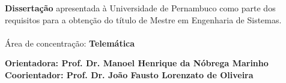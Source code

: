 \begin{flushright}
    \vspace{0.5in}
    \parbox{3.50in}
    {\textbf{Dissertação} apresentada à Universidade de Pernambuco como parte dos requisitos para a obtenção do título de Mestre em Engenharia de Sistemas.\\ 
    \\Área de concentração: \textbf{Telemática} }

\end{flushright}

\vspace{1.2ex}

\begin{center}



\vspace{1ex} {\textbf{Orientadora: Prof. Dr. Manoel Henrique da Nóbrega Marinho} }\\
\vspace{1ex} {\textbf{Coorientador: Prof. Dr. João Fausto Lorenzato de Oliveira} }


\vspace{0.2in}
\vspace{18pt}{Recife, Março de 2019.}

\end{center}

